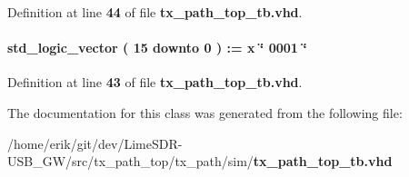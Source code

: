 Definition at line {\bf 44} of file {\bf tx\+\_\+path\+\_\+top\+\_\+tb.\+vhd}.

\paragraph[{txant\+\_\+cyc\+\_\+before\+\_\+en}]{ {\bfseries \textcolor{comment}{std\+\_\+logic\+\_\+vector}\textcolor{vhdlchar}{ }\textcolor{vhdlchar}{(}\textcolor{vhdlchar}{ }\textcolor{vhdlchar}{ } \textcolor{vhdldigit}{15} \textcolor{vhdlchar}{ }\textcolor{keywordflow}{downto}\textcolor{vhdlchar}{ }\textcolor{vhdlchar}{ } \textcolor{vhdldigit}{0} \textcolor{vhdlchar}{ }\textcolor{vhdlchar}{)}\textcolor{vhdlchar}{ }\textcolor{vhdlchar}{ }\textcolor{vhdlchar}{ }\textcolor{vhdlchar}{\+:}\textcolor{vhdlchar}{=}\textcolor{vhdlchar}{ }\textcolor{vhdlchar}{ }\textcolor{vhdlchar}{x}\textcolor{vhdlchar}{ }\textcolor{keyword}{\char`\"{} 0001 \char`\"{}}\textcolor{vhdlchar}{ }} \hspace{0.3cm}{\ttfamily [Signal]}}\label{classtx__path__top__tb_1_1tb__behave_a7602cfb2f9e734470454a52feb81557e}


Definition at line {\bf 43} of file {\bf tx\+\_\+path\+\_\+top\+\_\+tb.\+vhd}.



The documentation for this class was generated from the following file\+:\begin{DoxyCompactItemize}
\item 
/home/erik/git/dev/\+Lime\+S\+D\+R-\/\+U\+S\+B\+\_\+\+G\+W/src/tx\+\_\+path\+\_\+top/tx\+\_\+path/sim/{\bf tx\+\_\+path\+\_\+top\+\_\+tb.\+vhd}\end{DoxyCompactItemize}
